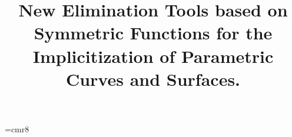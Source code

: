 \marginparwidth 0pt 
\oddsidemargin -1cm
\evensidemargin -1cm
\marginparsep 0pt
\topmargin -1cm
\textwidth 18cm
\textheight 24cm
\sloppy

\font\eirm=cmr8

\def \ce{\centering}
\def \N{{\rm I\kern -2.1pt N\hskip 1pt}}
\def \R{{\rm I\kern -2.2pt R\hskip 1pt}}

\def \Z{{\mathchoice {\hbox{$\textstyle {\rm Z\!\!Z}$}}
{\hbox{$\textstyle {\rm Z\!\!Z}$}} {\hbox{$\scriptstyle {\rm
Z\!\!Z}$}} {\hbox{$\scriptscriptstyle {\rm Z\!\!Z}$}}}}

\def \Q{{\mathchoice {\setbox0=\hbox{$\displaystyle\rm Q$}\hbox
{\raise 0.15\ht0\hbox to0pt{\kern0.4\wd0\vrule
height0.8\ht0\hss}\box0}} {\setbox0=\hbox{$\textstyle\rm
Q$}\hbox{\raise 0.15\ht0\hbox to0pt{\kern0.4\wd0\vrule
height0.8\ht0\hss}\box0}} {\setbox0=\hbox{$\scriptstyle\rm
Q$}\hbox{\raise 0.15\ht0\hbox to0pt{\kern0.4\wd0\vrule
height0.7\ht0\hss}\box0}} {\setbox0=\hbox{$\scriptscriptstyle\rm
Q$}\hbox{\raise 0.15\ht0\hbox to0pt{\kern0.4\wd0\vrule
height0.7\ht0\hss}\box0}}}}

\def\C{{\mathchoice {\setbox0=\hbox{$\displaystyle\rm C$}\hbox{\hbox
to0pt{\kern0.4\wd0\vrule height0.9\ht0\hss}\box0}}
{\setbox0=\hbox{$\textstyle\rm C$}\hbox{\hbox
to0pt{\kern0.4\wd0\vrule height0.9\ht0\hss}\box0}}
{\setbox0=\hbox{$\scriptstyle\rm C$}\hbox{\hbox
to0pt{\kern0.4\wd0\vrule height0.9\ht0\hss}\box0}}
{\setbox0=\hbox{$\scriptscriptstyle\rm C$}\hbox{\hbox
to0pt{\kern0.4\wd0\vrule height0.9\ht0\hss}\box0}}}}


\def \eop {\hbox{}\nobreak\hfill
   \vrule width 1.4mm height 1.4mm depth 0mm
          \par \goodbreak \smallskip}

\newtheorem{teorema}{Theorem}[section]
\newtheorem{definicion}[teorema]{Definition}
\newtheorem{proposicion}[teorema]{Proposition}
\newtheorem{corolario}[teorema]{Corollary}
\newtheorem{lema}[teorema]{Lemma}
\newtheorem{remark}[teorema]{Remark}
\newtheorem{algorithm}{Algorithm}
\newtheorem{ejemplo}[teorema]{Example}
\newcommand{\demostracion}{\paragraph*{\bf Proof:}}


\title{New Elimination Tools based on Symmetric Functions for the  
Implicitization of  Parametric Curves and Surfaces.}

